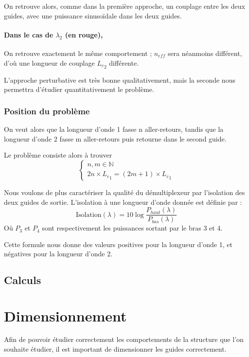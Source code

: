 \documentclass[a4paper,11pt]{report}
\begin{document}
On retrouve alors, comme dans la première approche, un couplage entre les deux guides, avec une puissance sinusoïdale dans les deux guides.

\subsubsection*{Dans le cas de $\lambda_2$ (en rouge),}
On retrouve exactement le même comportement ; $n_{eff}$ sera néanmoins différent, d'où une longueur de couplage ${L_c}_2$ différente.


L'approche perturbative est très bonne qualitativement, mais la seconde nous permettra d'étudier quantitativement le problème.

\subsection{Position du problème}
On veut alors que la longueur d'onde 1 fasse n aller-retours, tandis que la longueur d'onde 2 fasse m aller-retours puis retourne dans le second guide.

Le problème consiste alors à trouver 
\[
\left\{
    \begin{array}{ll}
    n, m\in \mathbb{N} \\
    2n\times {L_c}_1 = (2m+1)\times {L_c}_1

    \end{array}
\right.
\]

Nous voulons de plus caractériser la qualité du démultiplexeur par l'isolation des deux guides de sortie.
L'isolation à une longueur d'onde donnée est définie par :
\[
    \text{Isolation}(\lambda) = 10 \log\frac{P_{haut}(\lambda)}{P_{bas}(\lambda)}
\]
Où $P_3$ et $P_4$ sont respectivement les puissances sortant par le bras 3 et 4.

Cette formule nous donne des valeurs positives pour la longueur d'onde 1, et négatives pour la longueur d'onde 2.



\section{Calculs}%
\chapter{Dimensionnement}
Afin de pouvoir étudier correctement les comportements de la structure que l'on souhaite étudier, il est important de dimensionner les guides correctement.
\end{document}
